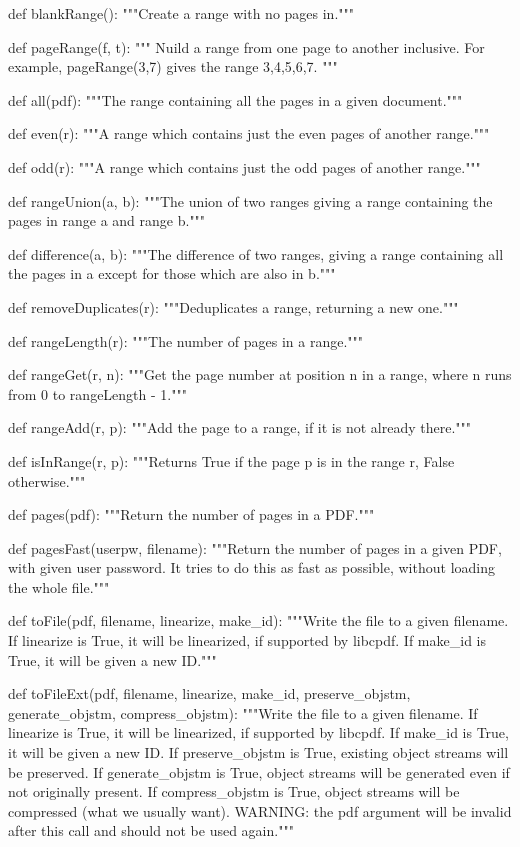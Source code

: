 def blankRange():
    """Create a range with no pages in."""

def pageRange(f, t):
    """ Nuild a range from one page to another inclusive.
    For example, pageRange(3,7) gives the range 3,4,5,6,7. """

def all(pdf):
    """The range containing all the pages in a given document."""

def even(r):
    """A range which contains just the even pages of another
    range."""

def odd(r):
    """A range which contains just the odd pages of another
    range."""

def rangeUnion(a, b):
    """The union of two ranges giving a range containing
    the pages in range a and range b."""

def difference(a, b):
    """The difference of two ranges, giving a range
    containing all the pages in a except for those which are also in b."""

def removeDuplicates(r):
    """Deduplicates a range, returning a new one."""

def rangeLength(r):
    """The number of pages in a range."""

def rangeGet(r, n):
    """Get the page number at position n in a range, where
    n runs from 0 to rangeLength - 1."""

def rangeAdd(r, p):
    """Add the page to a range, if it is not already
    there."""

def isInRange(r, p):
    """Returns True if the page p is in the range r, False otherwise."""

def pages(pdf):
    """Return the number of pages in a PDF."""

def pagesFast(userpw, filename):
    """Return the number of pages in a given
    PDF, with given user password. It tries to do this as fast as
    possible, without loading the whole file."""

def toFile(pdf, filename, linearize, make_id):
    """Write the file to a given filename. If linearize is True, it will be
    linearized, if supported by libcpdf. If make_id is True, it will be given a
    new ID."""

def toFileExt(pdf, filename, linearize, make_id, preserve_objstm,
              generate_objstm, compress_objstm):
    """Write the file to a given filename. If linearize is True, it will be
    linearized, if supported by libcpdf. If make_id is True, it will be given a
    new ID.  If preserve_objstm is True, existing object streams will be
    preserved. If generate_objstm is True, object streams will be generated
    even if not originally present. If compress_objstm is True, object streams
    will be compressed (what we usually want). WARNING: the pdf argument will
    be invalid after this call and should not be used again."""

